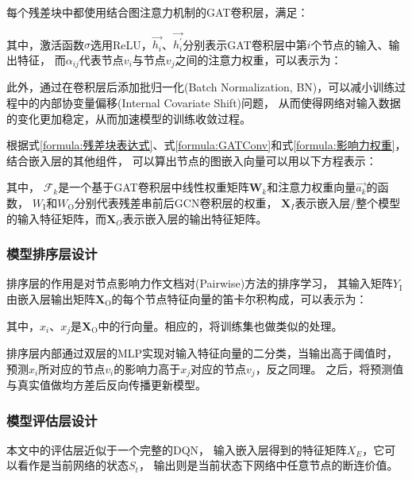\documentclass[twocolumn]{morningstar}
\begin{document}
每个残差块中都使用结合图注意力机制的GAT卷积层，满足：

\noindent 其中，激活函数$\sigma$选用ReLU，$\vec{h_i}$、$\vec{h_i^\prime}$分别表示GAT卷积层中第$i$个节点的输入、输出特征，
而$\alpha_{ij}$代表节点$v_i$与节点$v_j$之间的注意力权重，可以表示为：


此外，通过在卷积层后添加批归一化(Batch Normalization, BN)，可以减小训练过程中的内部协变量偏移(Internal Covariate Shift)问题，
从而使得网络对输入数据的变化更加稳定，从而加速模型的训练收敛过程。

根据式\ref{formula:残差块表达式}、式\ref{formula:GATConv}和式\ref{formula:影响力权重}，结合嵌入层的其他组件，
可以算出节点的图嵌入向量可以用以下方程表示：



\noindent 其中，
$\mathcal{F}_k$是一个基于GAT卷积层中线性权重矩阵$\mathbf{W}_k$和注意力权重向量$\vec{a_{k}}$的函数，
$W_\mathrm{I}$和$W_\mathrm{O}$分别代表残差串前后GCN卷积层的权重，
$\mathbf{X}_{I}$表示嵌入层/整个模型的输入特征矩阵，而$\mathbf{X}_{O}$表示嵌入层的输出特征矩阵。

\subsubsection{模型排序层设计}\label{sec:RankingLayer}
排序层的作用是对节点影响力作文档对(Pairwise)方法的排序学习，
其输入矩阵$Y_\mathrm{I}$由嵌入层输出矩阵$\mathbf{X}_\mathrm{O}$的每个节点特征向量的笛卡尔积构成，可以表示为：



\noindent 其中，$x_i$、$x_j$是$\mathbf{X}_\mathrm{O}$中的行向量。相应的，将训练集也做类似的处理。

% 

排序层内部通过双层的MLP实现对输入特征向量的二分类，当输出高于阈值时，预测$x_i$所对应的节点$v_i$的影响力高于$x_j$对应的节点$v_j$，反之同理。
之后，将预测值与真实值做均方差后反向传播更新模型。


\subsubsection{模型评估层设计}\label{sec:ValuingLayer}

本文中的评估层近似于一个完整的DQN，
输入嵌入层得到的特征矩阵$X_E$，它可以看作是当前网络的状态$S_t$，
输出则是当前状态下网络中任意节点的断连价值。

% 
\end{document}
